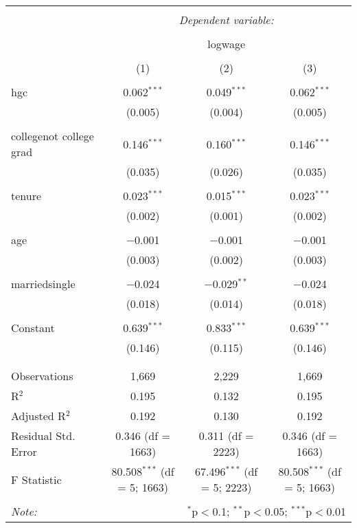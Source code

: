 \documentclass{article}
\begin{document}
\begin{table}[!htbp] \centering 
  \caption{} 
  \label{} 
\begin{tabular}{@{\extracolsep{5pt}}lccc} 
\\[-1.8ex]\hline 
\hline \\[-1.8ex] 
 & \multicolumn{3}{c}{\textit{Dependent variable:}} \\ 
\cline{2-4} 
\\[-1.8ex] & \multicolumn{3}{c}{logwage} \\ 
\\[-1.8ex] & (1) & (2) & (3)\\ 
\hline \\[-1.8ex] 
 hgc & 0.062$^{***}$ & 0.049$^{***}$ & 0.062$^{***}$ \\ 
  & (0.005) & (0.004) & (0.005) \\ 
  & & & \\ 
 collegenot college grad & 0.146$^{***}$ & 0.160$^{***}$ & 0.146$^{***}$ \\ 
  & (0.035) & (0.026) & (0.035) \\ 
  & & & \\ 
 tenure & 0.023$^{***}$ & 0.015$^{***}$ & 0.023$^{***}$ \\ 
  & (0.002) & (0.001) & (0.002) \\ 
  & & & \\ 
 age & $-$0.001 & $-$0.001 & $-$0.001 \\ 
  & (0.003) & (0.002) & (0.003) \\ 
  & & & \\ 
 marriedsingle & $-$0.024 & $-$0.029$^{**}$ & $-$0.024 \\ 
  & (0.018) & (0.014) & (0.018) \\ 
  & & & \\ 
 Constant & 0.639$^{***}$ & 0.833$^{***}$ & 0.639$^{***}$ \\ 
  & (0.146) & (0.115) & (0.146) \\ 
  & & & \\ 
\hline \\[-1.8ex] 
Observations & 1,669 & 2,229 & 1,669 \\ 
R$^{2}$ & 0.195 & 0.132 & 0.195 \\ 
Adjusted R$^{2}$ & 0.192 & 0.130 & 0.192 \\ 
Residual Std. Error & 0.346 (df = 1663) & 0.311 (df = 2223) & 0.346 (df = 1663) \\ 
F Statistic & 80.508$^{***}$ (df = 5; 1663) & 67.496$^{***}$ (df = 5; 2223) & 80.508$^{***}$ (df = 5; 1663) \\ 
\hline 
\hline \\[-1.8ex] 
\textit{Note:}  & \multicolumn{3}{r}{$^{*}$p$<$0.1; $^{**}$p$<$0.05; $^{***}$p$<$0.01} \\ 
\end{tabular} 
\end{table} 
\end{document}
